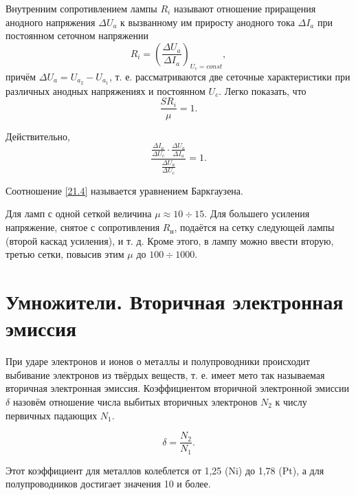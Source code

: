 \documentclass[a4paper,10pt]{book}
\begin{document}
Внутренним сопротивлением лампы $R_i$ называют отношение приращения анодного напряжения $\Delta U_a$ к вызванному им приросту анодного тока $\Delta I_a$ при постоянном сеточном напряжении\begin{equation}\label{21.3}
R_i = (\frac{\Delta U_a}{\Delta I_a})_{U_c=const},
\end{equation}
причём $\Delta U_a = U_{a_2}-U_{a_1}$, т. е. рассматриваются две сеточные характеристики при различных анодных напряжениях и постоянном $U_c$. Легко показать, что\begin{equation}\label{21.4}
\frac{S R_i}{\mu} = 1.
\end{equation}

Действительно, \begin{equation}
\frac{\frac{\Delta I_a}{\Delta U_c}\cdot\frac{\Delta U_a}{\Delta I_a}}{\frac{\Delta U_a}{\Delta U_c}} = 1.\nonumber
\end{equation}

Соотношение \ref{21.4} называется уравнением Баркгаузена.

Для ламп с одной сеткой величина $\mu \approx 10 \div 15$. Для большего усиления напряжение, снятое с сопротивления $R_\text{н}$, подаётся на сетку следующей лампы (второй каскад усиления), и т. д. Кроме этого, в лампу можно ввести вторую, третью сетки, повысив этим $\mu$ до $100 \div 1000$.

\section{Умножители. Вторичная электронная эмиссия}

При ударе электронов и ионов о металлы и полупроводники происходит выбивание электронов из твёрдых веществ, т. е. имеет мето так называемая вторичная электронная эмиссия. Коэффициентом вторичной электронной эмиссии $\delta$ назовём отношение числа выбитых вторичных электронов $N_2$ к числу первичных падающих $N_1$.

\begin{equation}
\delta = \frac{N_2}{N_1}.
\end{equation}

Этот коэффициент для металлов колеблется от 1,25 (Ni) до 1,78 (Pt), а для полупроводников достигает значения 10 и более.
\end{document}

